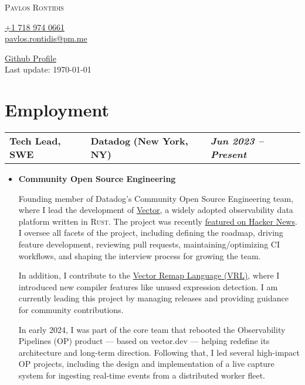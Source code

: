 \documentclass[a4paper,10pt]{article}
\newcommand*{\mahogany}{\textcolor{darkmahogany}}
\newcommand{\jobtitle}[4]{
\vspace{0.3cm}
\begin{tabularx}
{\textwidth}
{ >{\raggedright\arraybackslash}p{6.5cm}
  >{\raggedright\arraybackslash}X
  >{\raggedleft\arraybackslash}p{4cm} }
\fontsize{13pt}{15pt}\selectfont\textbf{#1} &

\large\textbf{\mahogany{#2}} \normalsize\textbf{(#3)} &
\textit{\large\textbf{#4}}
\end{tabularx}
\vspace{-0.4cm}
}
\begin{document}
\pagestyle{empty} %

\begin{minipage}{.40\linewidth}
\begin{flushleft}
\Huge \textsc{Pavlos Rontidis}
\end{flushleft}
\end{minipage}
\hfill
\begin{minipage}{.25\linewidth}
\begin{flushright}
\href{tel:15555555555}{+1 718 974 0661} \\
\href{mailto:pavlos.rontidis@pm.me}{pavlos.rontidis@pm.me}\\
\end{flushright}
\end{minipage}
\hfill
\begin{minipage}{.30\linewidth}
\begin{flushright}
\href{https://github.com/pront}{Github Profile} \\
Last update: \today
\end{flushright}
\end{minipage}

\noindent\makebox[\linewidth]{\rule{\linewidth}{0.4pt}}

\section{Employment}
\jobtitle{Tech Lead, SWE}{Datadog}{New York, NY}{Jun 2023 – Present}
\begin{itemize}[leftmargin=.27in,label=] \setlength\itemsep{-0.1cm}
    \item \textbf{Community Open Source Engineering}

    Founding member of Datadog’s Community Open Source Engineering team, where I lead the development of \href{https://github.com/vectordotdev/vector}{Vector}, a widely adopted observability data platform written in \textsc{Rust}. The project was recently \href{https://news.ycombinator.com/item?id=39737122}{featured on Hacker News}. I oversee all facets of the project, including defining the roadmap, driving feature development, reviewing pull requests, maintaining/optimizing CI workflows, and shaping the interview process for growing the team.

    In addition, I contribute to the \href{https://github.com/vectordotdev/vrl}{Vector Remap Language (VRL)}, where I introduced new compiler features like unused expression detection. I am currently leading this project by managing releases and providing guidance for community contributions.

    In early 2024, I was part of the core team that rebooted the Observability Pipelines (OP) product — based on vector.dev — helping redefine its architecture and long-term direction. Following that, I led several high-impact OP projects, including the design and implementation of a live capture system for ingesting real-time events from a distributed worker fleet.
\end{itemize}
\end{document}
